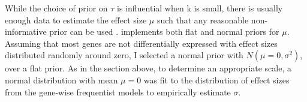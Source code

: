 While the choice of prior on $\tau$ is influential when k is small, there is usually enough data to estimate the effect size $\mu$ such that any reasonable non-informative prior can be used \autocite{gelman2006PriorDistributionsVariance,friede2017MetaanalysisFewSmall}.
 implements both flat and normal priors for $\mu$.
%
Assuming that most genes are not differentially expressed with effect sizes distributed randomly around zero, I selected a normal prior with $N(\mu=0, \sigma^2)$, over a flat prior. As in the section above, to determine an appropriate scale, a normal distribution with mean $\mu = 0$ was fit to the distribution of effect sizes from the gene-wise frequentist models to empirically estimate $\sigma$.


